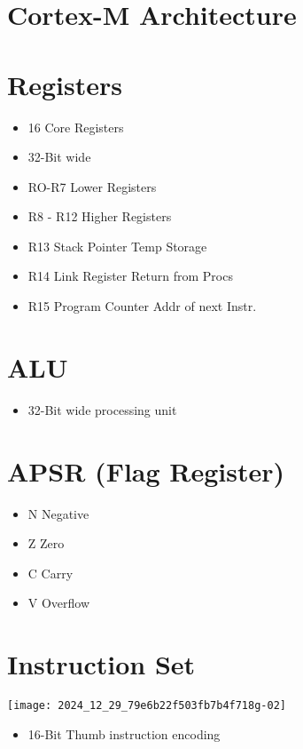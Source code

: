 \section{Cortex-M Architecture}

\section*{Registers}
\begin{itemize}
  \item 16 Core Registers
  \item 32-Bit wide
  \item RO-R7 Lower Registers
  \item R8 - R12 Higher Registers
  \item R13 Stack Pointer Temp Storage
  \item R14 Link Register Return from Procs
  \item R15 Program Counter Addr of next Instr.
\end{itemize}

\section*{ALU}
\begin{itemize}
  \item 32-Bit wide processing unit
\end{itemize}

\section*{APSR (Flag Register)}
\begin{itemize}
  \item N Negative
  \item Z Zero
  \item C Carry
  \item V Overflow
\end{itemize}

\section*{Instruction Set}
\begin{center}
\texttt{[image: 2024\_12\_29\_79e6b22f503fb7b4f718g-02]}
\end{center}

\begin{itemize}
  \item 16-Bit Thumb instruction encoding
\end{itemize}

